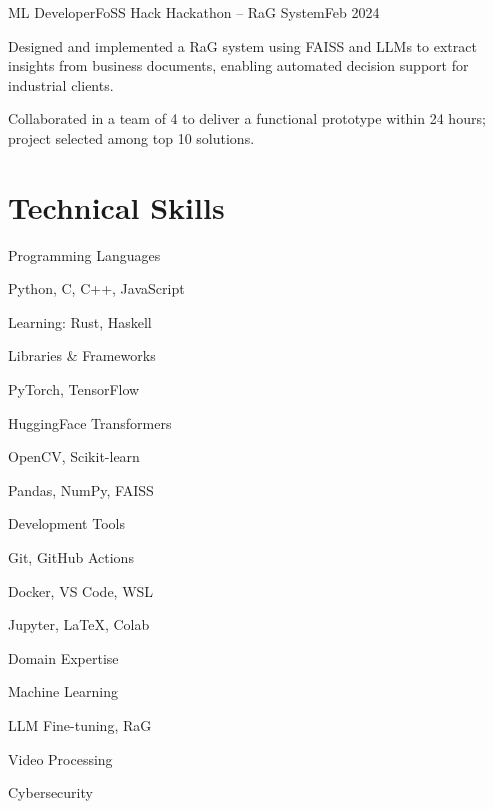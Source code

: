 \documentclass[10pt, letterpaper]{article}
\begin{document}
\begin{experienceentry}{ML Developer}{FoSS Hack Hackathon – RaG System}{Feb 2024}
    \item Designed and implemented a RaG system using FAISS and LLMs to extract insights from business documents, enabling automated decision support for industrial clients.
    \item Collaborated in a team of 4 to deliver a functional prototype within 24 hours; project selected among top 10 solutions.
\end{experienceentry}

\section{Technical Skills}
\begin{minipage}{\linewidth}
\begin{multicols}{2}
    \begin{skillsection}{Programming Languages}
        \item Python, C, C++, JavaScript
        \item Learning: Rust, Haskell
    \end{skillsection}
    
    \begin{skillsection}{Libraries \& Frameworks}
        \item PyTorch, TensorFlow
        \item HuggingFace Transformers
        \item OpenCV, Scikit-learn
        \item Pandas, NumPy, FAISS
    \end{skillsection}

    \columnbreak
    \begin{skillsection}{Development Tools}
        \item Git, GitHub Actions
        \item Docker, VS Code, WSL
        \item Jupyter, LaTeX, Colab
    \end{skillsection}
    
    \begin{skillsection}{Domain Expertise}
        \item Machine Learning
        \item LLM Fine-tuning, RaG
        \item Video Processing
        \item Cybersecurity
    \end{skillsection}
\end{multicols}
\end{minipage}
\end{document}
